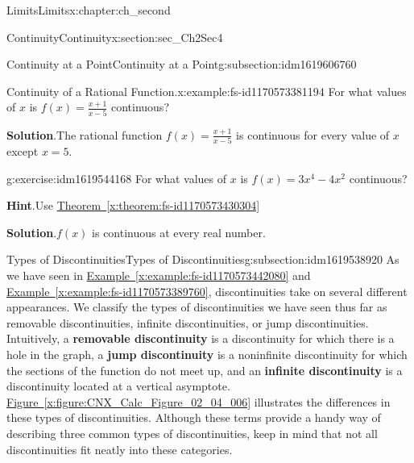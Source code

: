 \documentclass[oneside,10pt,]{book}
\newcommand{\blocktitlefont}{\relax}
\newcommand{\xreffont}{\relax}
\newcommand{\terminology}[1]{\textbf{#1}}
\numberwithin{equation}{section}
\begin{document}
\begin{chapterptx}{Limits}{}{Limits}{}{}{x:chapter:ch_second}
\begin{sectionptx}{Continuity}{}{Continuity}{}{}{x:section:sec_Ch2Sec4}
\begin{subsectionptx}{Continuity at a Point}{}{Continuity at a Point}{}{}{g:subsection:idm1619606760}
\begin{example}{Continuity of a Rational Function.}{x:example:fs-id1170573381194}%
For what values of \(x\) is \(f(x)=\frac{x+1}{x-5}\) continuous?%
\par\smallskip%
\noindent\textbf{\blocktitlefont Solution}.\hypertarget{g:solution:idm1619544552}{}\quad{}The rational function \(f(x)=\frac{x+1}{x-5}\) is continuous for every value of \(x\) except \(x=5.\)%
\end{example}
\begin{inlineexercise}{}{g:exercise:idm1619544168}%
For what values of \(x\) is \(f(x)=3x^4-4x^2\) continuous?%
\par\smallskip%
\noindent\textbf{\blocktitlefont Hint}.\hypertarget{g:hint:idm1619537000}{}\quad{}Use \hyperref[x:theorem:fs-id1170573430304]{Theorem~{\xreffont\ref{x:theorem:fs-id1170573430304}}}%
\par\smallskip%
\noindent\textbf{\blocktitlefont Solution}.\hypertarget{g:solution:idm1619537512}{}\quad{}\(f(x)\) is continuous at every real number.%
\end{inlineexercise}%
\end{subsectionptx}
%
%
\typeout{************************************************}
\typeout{************************************************}
%
\begin{subsectionptx}{Types of Discontinuities}{}{Types of Discontinuities}{}{}{g:subsection:idm1619538920}
As we have seen in \hyperref[x:example:fs-id1170573442080]{Example~{\xreffont\ref{x:example:fs-id1170573442080}}} and \hyperref[x:example:fs-id1170573389760]{Example~{\xreffont\ref{x:example:fs-id1170573389760}}}, discontinuities take on several different appearances. We classify the types of discontinuities we have seen thus far as removable discontinuities, infinite discontinuities, or jump discontinuities. Intuitively, a \terminology{removable discontinuity} is a discontinuity for which there is a hole in the graph, a \terminology{jump discontinuity} is a noninfinite discontinuity for which the sections of the function do not meet up, and an \terminology{infinite discontinuity} is a discontinuity located at a vertical asymptote. \hyperref[x:figure:CNX_Calc_Figure_02_04_006]{Figure~{\xreffont\ref{x:figure:CNX_Calc_Figure_02_04_006}}} illustrates the differences in these types of discontinuities. Although these terms provide a handy way of describing three common types of discontinuities, keep in mind that not all discontinuities fit neatly into these categories.%

\end{subsectionptx}
\end{sectionptx}
\end{chapterptx}
\end{document}
